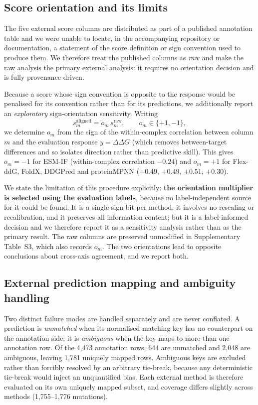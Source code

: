 \documentclass[11pt,a4paper]{article}
\begin{document}
\subsection*{Score orientation and its limits}
The five external score columns are distributed as part of a published annotation table and
we were unable to locate, in the accompanying repository or documentation, a statement of the
score definition or sign convention used to produce them. We therefore treat the published
columns as \(\emph{raw}\) and make the raw analysis the primary external analysis: it requires
no orientation decision and is fully provenance-driven.

Because a score whose sign convention is opposite to the response would be penalised for its
convention rather than for its predictions, we additionally report an \emph{exploratory}
sign-orientation sensitivity. Writing
\begin{equation}
  s_m^{\mathrm{aligned}} = o_m \, s_m^{\mathrm{raw}}, \qquad o_m \in \{+1, -1\},
  \label{eq:orientation}
\end{equation}
we determine \(o_m\) from the sign of the within-complex correlation between column \(m\)
and the evaluation response \(y = \Delta\Delta G\) (which removes between-target
differences and so isolates direction rather than predictive skill). This gives
\(o_m = -1\) for ESM-IF (within-complex correlation \(-0.24\)) and \(o_m = +1\) for
Flex-ddG, FoldX, DDGPred and proteinMPNN (\(+0.49\), \(+0.49\), \(+0.51\), \(+0.30\)).

We state the limitation of this procedure explicitly: \textbf{the orientation multiplier is
selected using the evaluation labels}, because no label-independent source for it could be
found. It is a single sign bit per method, it involves no rescaling or recalibration, and it
preserves all information content; but it is a label-informed decision and we therefore
report it as a sensitivity analysis rather than as the primary result. The raw columns are
preserved unmodified in Supplementary Table~S3, which also records \(o_m\). The two
orientations lead to opposite conclusions about cross-axis agreement, and we report both.

\subsection*{External prediction mapping and ambiguity handling}
Two distinct failure modes are handled separately and are never conflated. A prediction is
\emph{unmatched} when its normalised matching key has no counterpart on the annotation side;
it is \emph{ambiguous} when the key maps to more than one annotation row. Of the 4{,}473
annotation rows, 644 are unmatched and 2{,}048 are ambiguous, leaving 1{,}781 uniquely
mapped rows. Ambiguous keys are excluded rather than forcibly resolved by an arbitrary
tie-break, because any deterministic tie-break would inject an unquantified bias. Each
external method is therefore evaluated on its own uniquely mapped subset, and coverage
differs slightly across methods (1{,}755--1{,}776 mutations).
\end{document}
